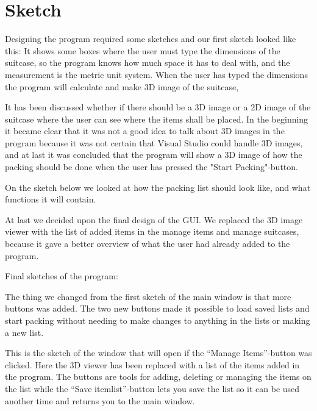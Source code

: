 \section{Sketch}

Designing the program required some sketches and our first sketch looked like this:
It shows some boxes where the user must type the dimensions of the suitcase, so the program knows how much space it has to deal with, and the measurement is the metric unit system.
When the user has typed the dimensions the program will calculate and make 3D image of the suitcase, 


It has been discussed whether if there should be a 3D image or a 2D image of the suitcase where the user can see where the items shall be placed. In the beginning it became clear that it was not a good idea to talk about 3D images in the program because it was not certain that Visual Studio could handle 3D images, and at last it was concluded that the program will show a 3D image of how the packing should be done when the user has pressed the "Start Packing"-button.


On the sketch below we looked at how the packing list should look like, and what functions it will contain.


At last we decided upon the final design of the GUI. We replaced the 3D image viewer with the list of added items in the manage items and manage suitcases, because it gave a better overview of what the user had already added to the program. 

Final sketches of the program:

The thing we changed from the first sketch of the main window is that more buttons was added. The two new buttons made it possible to load saved lists and start packing without needing to make changes to anything in the lists or making a new list.


This is the sketch of the window that will open if the “Manage Items”-button was clicked. Here the 3D viewer has been replaced with a list of the items added in the program. The buttons are tools for adding, deleting or managing the items on the list while the “Save itemlist”-button lets you save the list so it can be used another time and returns you to the main window.

